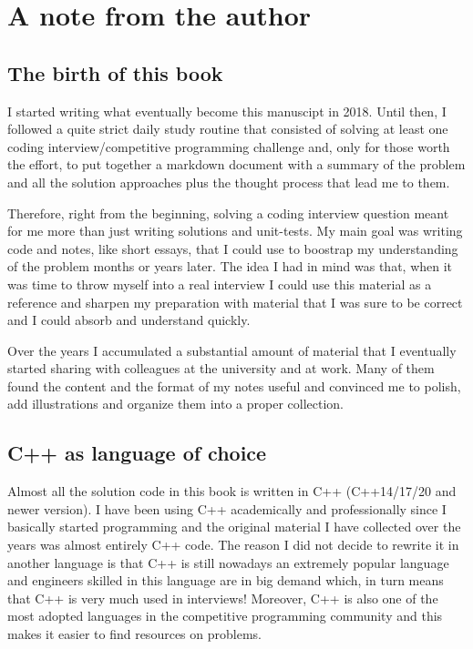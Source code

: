 \chapter*{A note from the author}

\section*{The birth of this book}
I started writing what eventually become this manuscipt in 2018. 
Until then, I followed a quite strict daily study routine that consisted of solving at least one coding interview/competitive programming challenge and, only for those worth the effort, to put together a markdown document with a summary of the problem and all the solution approaches plus the thought process that lead me to them.

Therefore, right from the beginning, solving a coding interview question meant for me more than just writing solutions and unit-tests.
My main goal was writing code and notes, like short essays, that I could use to boostrap my understanding of the problem months or years later.
The idea I had in mind was that, when it was time to throw myself into a real interview I could use this material as a reference and sharpen my preparation with material 
that I was sure to be correct and I could absorb and understand quickly.

Over the years I accumulated a substantial amount of material that I eventually started sharing with colleagues at the university and at work. 
Many of them found the content and the format of my notes useful and convinced me to polish, add illustrations and organize them into a proper collection.

\section*{C++ as language of choice}
Almost all the solution code in this book is written in C++ (C++14/17/20 and newer version). 
I have been using C++ academically and professionally since I basically started programming and the original material I have collected over the years was almost entirely C++ code. 
The reason I did not decide to rewrite it in another language is that C++ is still nowadays an extremely popular language and engineers skilled in this language are in big demand which, in turn means that C++ is very much used in interviews!
Moreover, C++ is also one of the most adopted languages in the competitive programming community and this makes it easier to find resources on problems.

